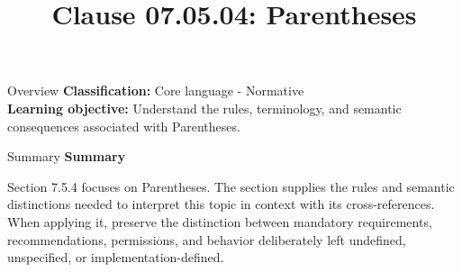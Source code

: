 \documentclass[10pt,letterpaper]{article}
\title{Clause 07.05.04: Parentheses}
\author{}
\date{}
\begin{document}
\maketitle
\begin{CornellOverviewBox}{Overview}
\textbf{Classification:} Core language - Normative\\[2pt]
\textbf{Learning objective:} Understand the rules, terminology, and semantic consequences associated with Parentheses.
\end{CornellOverviewBox}\begin{CornellSummaryBox}{Summary}
{\sffamily\bfseries\color{Accent} Summary}\par\vspace{3pt}Section 7.5.4 focuses on Parentheses. The section supplies the rules and semantic distinctions needed to interpret this topic in context with its cross-references. When applying it, preserve the distinction between mandatory requirements, recommendations, permissions, and behavior deliberately left undefined, unspecified, or implementation-defined.
\end{CornellSummaryBox}
\end{document}
